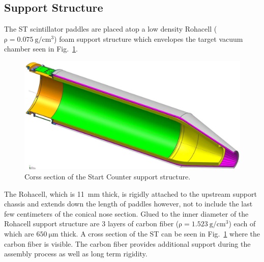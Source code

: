 \subsection{Support Structure} \label{sec:design_support}

The ST scintillator paddles are placed atop a low density Rohacell ($\mathrm{\rho = 0.075\ g/cm^{3}}$) foam support structure which envelopes the target vacuum chamber seen in Fig.~\ref{fig:stiso}.  
	\begin{figure}[!htb]
		\centering
		\includegraphics[width=1.0\columnwidth]{design/figs/st_iso}
		\caption{Corss section of the Start Counter support structure.}
		\label{fig:stiso}
	\end{figure}
The Rohacell, which is 11~mm thick, is rigidly attached to the upstream support chassis and extends down the length of paddles however, not to include the last few centimeters of the conical nose section.  Glued to the inner diameter of the Rohacell support structure are 3 layers of carbon fiber ($\mathrm{\rho = 1.523\ g/cm^{3}}$) each of which are $\mathrm{650\ \mu m}$ thick.  A cross section of the ST can be seen in Fig.~\ref{fig:stiso} where the carbon fiber is visible.  The carbon fiber provides additional support during the assembly process as well as long term rigidity.  

